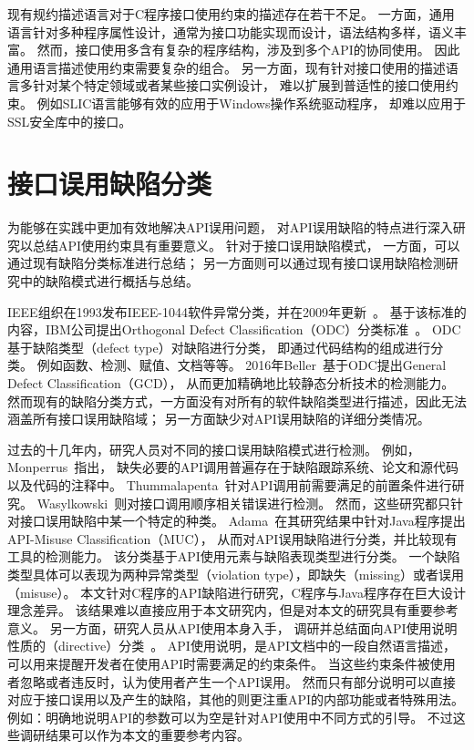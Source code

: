 现有规约描述语言对于C程序接口使用约束的描述存在若干不足。
一方面，通用语言针对多种程序属性设计，通常为接口功能实现而设计，语法结构多样，语义丰富。
然而，接口使用多含有复杂的程序结构，涉及到多个API的协同使用。
因此通用语言描述使用约束需要复杂的组合。
另一方面，现有针对接口使用的描述语言多针对某个特定领域或者某些接口实例设计，
难以扩展到普适性的接口使用约束。
例如SLIC语言能够有效的应用于Windows操作系统驱动程序，
却难以应用于SSL安全库中的接口。


\section{接口误用缺陷分类}
\label{sec:2.3}
为能够在实践中更加有效地解决API误用问题，
对API误用缺陷的特点进行深入研究以总结API使用约束具有重要意义。
针对于接口误用缺陷模式，
一方面，可以通过现有缺陷分类标准进行总结；
另一方面则可以通过现有接口误用缺陷检测研究中的缺陷模式进行概括与总结。

IEEE组织在1993发布IEEE-1044软件异常分类，并在2009年更新~\cite{09-ieee-classification}。
基于该标准的内容，IBM公司提出Orthogonal Defect Classification（ODC）分类标准~\cite{92-tse-odc}。
ODC基于缺陷类型（defect type）对缺陷进行分类，
即通过代码结构的组成进行分类。
例如函数、检测、赋值、文档等等。
2016年Beller~\cite{16-saner-evaluation}基于ODC提出General Defect Classification（GCD），
从而更加精确地比较静态分析技术的检测能力。
然而现有的缺陷分类方式，一方面没有对所有的软件缺陷类型进行描述，因此无法涵盖所有接口误用缺陷域；
另一方面缺少对API误用缺陷的详细分类情况。

过去的十几年内，研究人员对不同的接口误用缺陷模式进行检测。
例如，Monperrus~\cite{13-tosem-missing-call}指出，
缺失必要的API调用普遍存在于缺陷跟踪系统、论文和源代码以及代码的注释中。
Thummalapenta~\cite{09-icse-exception}针对API调用前需要满足的前置条件进行研究。
Wasylkowski~\cite{07-fse-object}则对接口调用顺序相关错误进行检测。
然而，这些研究都只针对接口误用缺陷中某一个特定的种类。
Adama~\cite{survey18}在其研究结果中针对Java程序提出API-Misuse Classification（MUC），
从而对API误用缺陷进行分类，并比较现有工具的检测能力。
该分类基于API使用元素与缺陷表现类型进行分类。
一个缺陷类型具体可以表现为两种异常类型（violation type），即缺失（missing）或者误用（misuse）。
本文针对C程序的API缺陷进行研究，C程序与Java程序存在巨大设计理念差异。
该结果难以直接应用于本文研究内，但是对本文的研究具有重要参考意义。
另一方面，研究人员从API使用本身入手，
调研并总结面向API使用说明性质的（directive）分类~\cite{09-icse-doc,12-ese-directive}。
API使用说明，是API文档中的一段自然语言描述，
可以用来提醒开发者在使用API时需要满足的约束条件。
当这些约束条件被使用者忽略或者违反时，认为使用者产生一个API误用。
然而只有部分说明可以直接对应于接口误用以及产生的缺陷，其他的则更注重API的内部功能或者特殊用法。
例如：明确地说明API的参数可以为空是针对API使用中不同方式的引导。
不过这些调研结果可以作为本文的重要参考内容。


